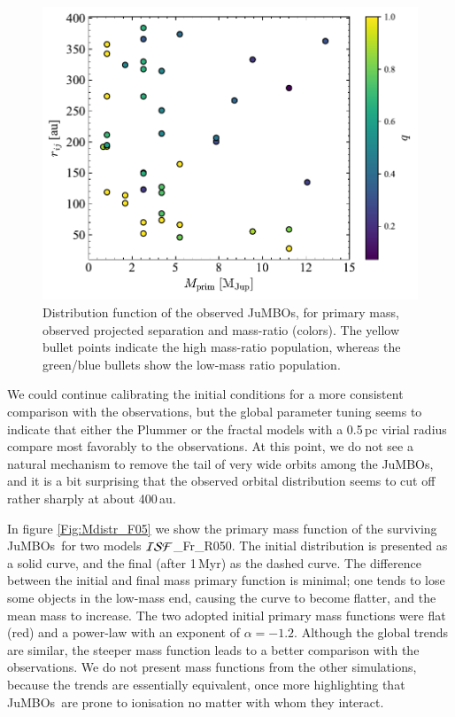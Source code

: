 \documentclass[submission,phys]{lib/SciPost}
\newcommand{\jumbos}{\mbox{JuMBOs}}
\begin{document}
\begin{figure}
    \centering
    \includegraphics[width=0.75\columnwidth]{figures/obs_q_mprim_sep.pdf}
    \caption{Distribution function of the observed \jumbos, for
      primary mass, observed projected separation and mass-ratio
      (colors). The yellow bullet points indicate the high mass-ratio
      population, whereas the green/blue bullets show the low-mass
      ratio population.
    }
    \label{Fig:obs_q_mprim_sep}
\end{figure}

We could continue calibrating the initial conditions for a more
consistent comparison with the observations, but the global parameter
tuning seems to indicate that either the Plummer or the fractal models
with a 0.5\,pc virial radius compare most favorably to the
observations.  At this point, we do not see a natural mechanism to
remove the tail of very wide orbits among the \jumbos, and it is a bit
surprising that the observed orbital distribution seems to cut off
rather sharply at about 400\,au.

In figure \ref{Fig:Mdistr_F05} we show the primary mass function of
the surviving \jumbos\, for two models ${\cal ISF}$\_Fr\_R050.  The
initial distribution is presented as a solid curve, and the final (after
1\,Myr) as the dashed curve. The difference between the initial and final
mass primary function is minimal; one tends to lose some objects in
the low-mass end, causing the curve to become flatter, and
the mean mass to increase. The two adopted initial primary mass
functions were flat (red) and a power-law with an exponent of $\alpha=-1.2$.
Although the global trends are similar, the steeper mass function
leads to a better comparison with the observations.  We do not present
mass functions from the other simulations, because the trends are essentially 
equivalent, once more highlighting that \jumbos\ are prone to
ionisation no matter with whom they interact.
\end{document}

